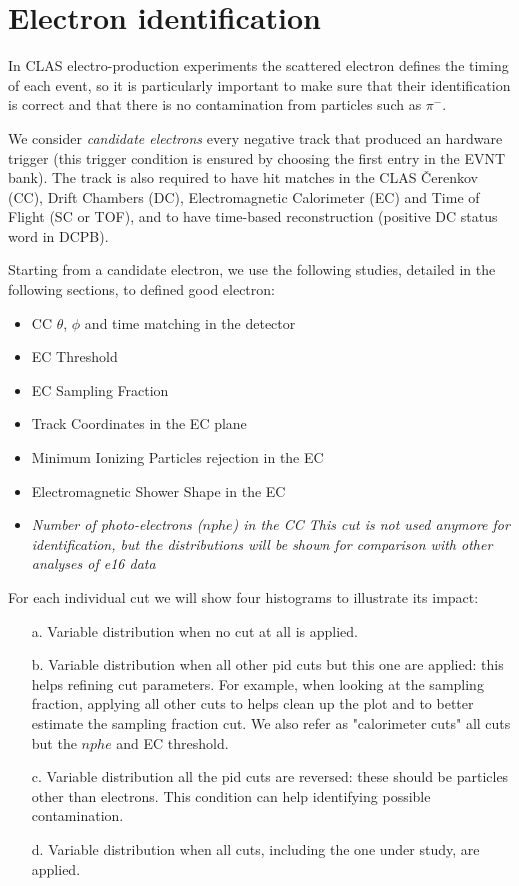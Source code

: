 \clearpage\newpage
\section{Electron identification}

In CLAS electro-production experiments
the scattered electron defines the timing of each event,
so it is particularly important to
make sure that their identification is correct and that
there is no contamination from particles such as $\pi^-$.

We consider {\it candidate electrons} every negative track
that produced an hardware trigger (this trigger condition is ensured by choosing
the first entry in the EVNT bank). The track is also required to have
hit matches in the CLAS \v Cerenkov (CC)\cite{bib:cc}, Drift Chambers (DC)\cite{bib:dc},
Electromagnetic Calorimeter (EC)\cite{bib:ec} and Time of Flight (SC or TOF)\cite{bib:ftof},
and to have time-based reconstruction (positive DC status word in DCPB).

Starting from a candidate electron, we use the following studies, detailed in the following sections,
to defined good electron:

\begin{itemize}
	\item CC $\theta$, $\phi$ and time matching in the  detector
	\item EC Threshold 
	\item EC Sampling Fraction 
	\item Track Coordinates in the EC plane 
	\item Minimum Ionizing Particles rejection in the EC
	\item Electromagnetic Shower Shape in the EC
	\item {\it Number of photo-electrons ($nphe$) in the CC
              This cut is not used anymore for identification,
              but the distributions will be shown for comparison with other analyses of e16 data }
\end{itemize}

For each individual cut we will show four histograms to illustrate its impact:

\begin{itemize}  
	\item[a.] Variable distribution when no cut at all is applied.
	\item[b.] Variable distribution when all other pid cuts but this one are applied:
	          this helps refining cut parameters.
	          For example, when looking at the sampling fraction, applying all other
	          cuts to helps clean up the plot and to better estimate the sampling fraction
	          cut. We also refer as "calorimeter cuts" all cuts but the $nphe$ and EC threshold.
	\item[c.] Variable distribution all the pid cuts are reversed: these should be particles other than electrons.
	          This condition can help identifying possible contamination.
	\item[d.] Variable distribution when all cuts, including the one under study, are applied.
\end{itemize}

